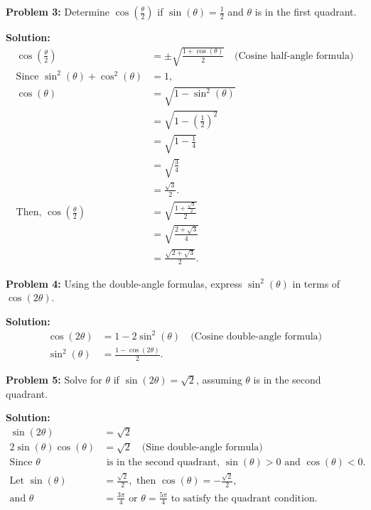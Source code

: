 \documentclass[a4paper,12pt]{book}
\begin{document}
\textbf{Problem 3:} Determine $\cos\left(\frac{\theta}{2}\right)$ if $\sin(\theta) = \frac{1}{2}$ and $\theta$ is in the first quadrant.

\textbf{Solution:}
\begin{align*}
\cos\left(\frac{\theta}{2}\right) &= \pm\sqrt{\frac{1 + \cos(\theta)}{2}} \quad \text{(Cosine half-angle formula)} \\
\text{Since } \sin^2(\theta) + \cos^2(\theta) &= 1, \\
\cos(\theta) &= \sqrt{1 - \sin^2(\theta)} \\
&= \sqrt{1 - \left(\frac{1}{2}\right)^2} \\
&= \sqrt{1 - \frac{1}{4}} \\
&= \sqrt{\frac{3}{4}} \\
&= \frac{\sqrt{3}}{2}. \\
\text{Then, } \cos\left(\frac{\theta}{2}\right) &= \sqrt{\frac{1 + \frac{\sqrt{3}}{2}}{2}} \\
&= \sqrt{\frac{2 + \sqrt{3}}{4}} \\
&= \frac{\sqrt{2 + \sqrt{3}}}{2}.
\end{align*}

\textbf{Problem 4:} Using the double-angle formulas, express $\sin^2(\theta)$ in terms of $\cos(2\theta)$.

\textbf{Solution:}
\begin{align*}
\cos(2\theta) &= 1 - 2\sin^2(\theta) \quad \text{(Cosine double-angle formula)} \\
\sin^2(\theta) &= \frac{1 - \cos(2\theta)}{2}.
\end{align*}

\textbf{Problem 5:} Solve for $\theta$ if $\sin(2\theta) = \sqrt{2}$, assuming $\theta$ is in the second quadrant.

\textbf{Solution:}
\begin{align*}
\sin(2\theta) &= \sqrt{2} \\
2\sin(\theta)\cos(\theta) &= \sqrt{2} \quad \text{(Sine double-angle formula)} \\
\text{Since } \theta &\text{ is in the second quadrant, } \sin(\theta) > 0 \text{ and } \cos(\theta) < 0. \\
\text{Let } \sin(\theta) &= \frac{\sqrt{2}}{2}, \text{ then } \cos(\theta) = -\frac{\sqrt{2}}{2}, \\
\text{and } \theta &= \frac{3\pi}{4} \text{ or } \theta = \frac{5\pi}{4} \text{ to satisfy the quadrant condition.}
\end{align*}
\end{document}
